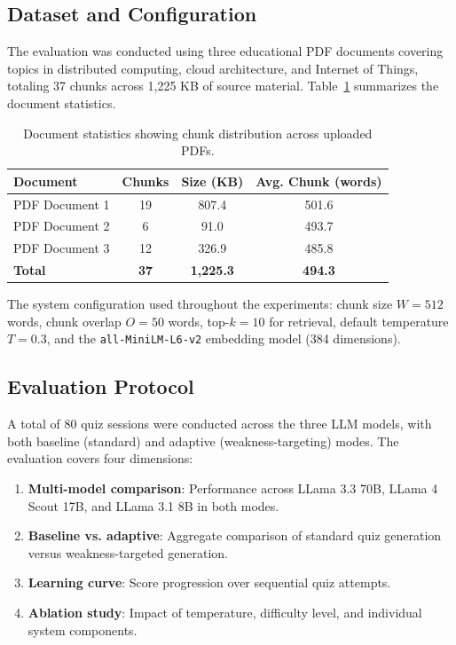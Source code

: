 \documentclass[runningheads]{llncs}
\begin{document}
\subsection{Dataset and Configuration}

The evaluation was conducted using three educational PDF documents covering topics in distributed computing, cloud architecture, and Internet of Things, totaling 37 chunks across 1,225 KB of source material. Table~\ref{tab:documents} summarizes the document statistics.

\begin{table}[H]
\centering
\caption{Document statistics showing chunk distribution across uploaded PDFs.}
\label{tab:documents}
\begin{tabular}{lccc}
\toprule
\textbf{Document} & \textbf{Chunks} & \textbf{Size (KB)} & \textbf{Avg. Chunk (words)} \\
\midrule
PDF Document 1 & 19 & 807.4 & 501.6 \\
PDF Document 2 & 6 & 91.0 & 493.7 \\
PDF Document 3 & 12 & 326.9 & 485.8 \\
\midrule
\textbf{Total} & \textbf{37} & \textbf{1,225.3} & \textbf{494.3} \\
\bottomrule
\end{tabular}
\end{table}

The system configuration used throughout the experiments: chunk size $W = 512$ words, chunk overlap $O = 50$ words, top-$k = 10$ for retrieval, default temperature $T = 0.3$, and the \texttt{all-MiniLM-L6-v2} embedding model (384 dimensions).

\subsection{Evaluation Protocol}

A total of 80 quiz sessions were conducted across the three LLM models, with both baseline (standard) and adaptive (weakness-targeting) modes. The evaluation covers four dimensions:
\begin{enumerate}
    \item \textbf{Multi-model comparison}: Performance across LLama 3.3 70B, LLama 4 Scout 17B, and LLama 3.1 8B in both modes.
    \item \textbf{Baseline vs. adaptive}: Aggregate comparison of standard quiz generation versus weakness-targeted generation.
    \item \textbf{Learning curve}: Score progression over sequential quiz attempts.
    \item \textbf{Ablation study}: Impact of temperature, difficulty level, and individual system components.
\end{enumerate}
\end{document}
